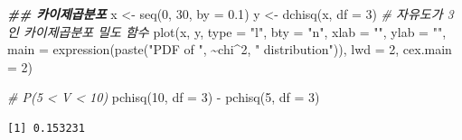 \documentclass[
  11pt,
]{krantz}
\newenvironment{Shaded}{\begin{snugshade}}{\end{snugshade}}
\newcommand{\AttributeTok}[1]{\textcolor[rgb]{0.61,0.61,0.61}{#1}}
\newcommand{\CommentTok}[1]{\textcolor[rgb]{0.37,0.37,0.37}{\textit{#1}}}
\newcommand{\DecValTok}[1]{\textcolor[rgb]{0.06,0.06,0.06}{#1}}
\newcommand{\DocumentationTok}[1]{\textcolor[rgb]{0.37,0.37,0.37}{\textbf{\textit{#1}}}}
\newcommand{\FloatTok}[1]{\textcolor[rgb]{0.06,0.06,0.06}{#1}}
\newcommand{\FunctionTok}[1]{\textcolor[rgb]{0,0,0}{#1}}
\newcommand{\NormalTok}[1]{#1}
\newcommand{\OtherTok}[1]{\textcolor[rgb]{0.37,0.37,0.37}{#1}}
\newcommand{\SpecialCharTok}[1]{\textcolor[rgb]{0,0,0}{#1}}
\newcommand{\StringTok}[1]{\textcolor[rgb]{0.5,0.5,0.5}{#1}}
\begin{document}
\begin{Shaded}
\begin{Highlighting}[]
\DocumentationTok{\#\# 카이제곱분포 }
\NormalTok{x }\OtherTok{\textless{}{-}} \FunctionTok{seq}\NormalTok{(}\DecValTok{0}\NormalTok{, }\DecValTok{30}\NormalTok{, }\AttributeTok{by =} \FloatTok{0.1}\NormalTok{)}
\NormalTok{y }\OtherTok{\textless{}{-}} \FunctionTok{dchisq}\NormalTok{(x, }\AttributeTok{df =} \DecValTok{3}\NormalTok{) }\CommentTok{\# 자유도가 3인 카이제곱분포 밀도 함수}
\FunctionTok{plot}\NormalTok{(x, y, }\AttributeTok{type =} \StringTok{"l"}\NormalTok{,}
     \AttributeTok{bty =} \StringTok{"n"}\NormalTok{, }
     \AttributeTok{xlab =} \StringTok{""}\NormalTok{, }\AttributeTok{ylab =} \StringTok{""}\NormalTok{, }
     \AttributeTok{main =} \FunctionTok{expression}\NormalTok{(}\FunctionTok{paste}\NormalTok{(}\StringTok{"PDF of "}\NormalTok{, }\SpecialCharTok{\textasciitilde{}}\NormalTok{chi}\SpecialCharTok{\^{}}\DecValTok{2}\NormalTok{, }\StringTok{" distribution"}\NormalTok{)), }
     \AttributeTok{lwd =} \DecValTok{2}\NormalTok{, }
     \AttributeTok{cex.main =} \DecValTok{2}\NormalTok{)}

\CommentTok{\# P(5 \textless{} V \textless{} 10)}
\FunctionTok{pchisq}\NormalTok{(}\DecValTok{10}\NormalTok{, }\AttributeTok{df =} \DecValTok{3}\NormalTok{) }\SpecialCharTok{{-}} \FunctionTok{pchisq}\NormalTok{(}\DecValTok{5}\NormalTok{, }\AttributeTok{df =} \DecValTok{3}\NormalTok{)}
\end{Highlighting}
\end{Shaded}

\begin{verbatim}
[1] 0.153231
\end{verbatim}
\end{document}
